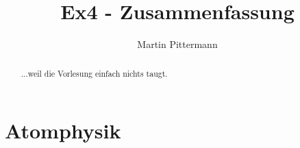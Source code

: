 \documentclass[notitlepage]{report}
\title{Ex4 - Zusammenfassung}
\author{Martin Pittermann}
\begin{document}
\maketitle
\begin{abstract}
	...weil die Vorlesung einfach nichts taugt.\\
\end{abstract}

\chapter{Atomphysik}







\end{document}
